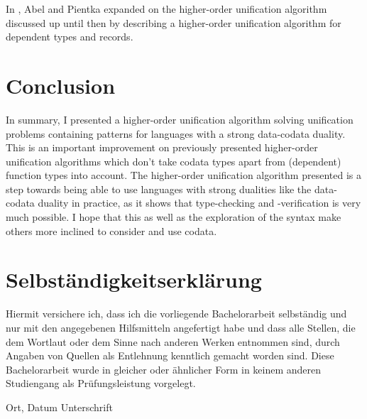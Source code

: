 \documentclass[twoside,12pt,a4paper]{article}
\begin{document}
In \cite{10.5555/2021953.2021960}, Abel and Pientka expanded on the higher-order unification algorithm discussed up until then 
by describing a higher-order unification algorithm for dependent types and records.





\section{Conclusion}\label{sec:conclusion}
In summary, I presented a higher-order unification algorithm solving unification problems containing patterns 
for languages with a strong data-codata duality.
This is an important improvement on previously presented higher-order unification algorithms
which don't take codata types apart from (dependent) function types into account. 
The higher-order unification algorithm presented is a step towards 
being able to use languages with strong dualities like the data-codata duality in practice,
as it shows that type-checking and -verification is very much possible.
I hope that this as well as the exploration of the syntax make others more inclined to consider and use codata.






\cleardoublepage

\thispagestyle{empty}
\section*{Selbständigkeitserklärung}

Hiermit versichere ich, dass ich die vorliegende Bachelorarbeit 
selbständig und nur mit den angegebenen Hilfsmitteln angefertigt habe und dass alle Stellen, die dem Wortlaut oder dem 
Sinne nach anderen Werken entnommen sind, durch Angaben von Quellen als 
Entlehnung kenntlich gemacht worden sind. 
Diese Bachelorarbeit wurde in gleicher oder ähnlicher Form in keinem anderen 
Studiengang als Prüfungsleistung vorgelegt. 

\vskip 3cm

Ort, Datum	\hfill Unterschrift \hfill 


\end{document}
